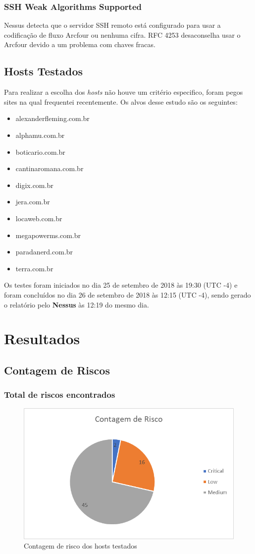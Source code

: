 \documentclass[
	12pt,				%
	openright,			%
	twoside,			%
	a4paper,			%
	english,			%
	french,				%
	spanish,			%
	brazil				%
	]{abntex2}
\begin{document}
\subsection{SSH Weak Algorithms Supported}
Nessus detecta que o servidor SSH remoto está configurado para usar a codificação de fluxo Arcfour ou nenhuma cifra. RFC 4253 desaconselha usar o Arcfour devido a um problema com chaves fracas.

\section{Hosts Testados}
Para realizar a escolha dos \textit{hosts} não houve um critério especifico, foram pegos sites na qual frequentei recentemente. Os alvos desse estudo são os seguintes:
\begin{itemize}
	\item alexanderfleming.com.br
	\item alphamu.com.br
	\item boticario.com.br
	\item cantinaromana.com.br
	\item digix.com.br
	\item jera.com.br
	\item locaweb.com.br
	\item megapowerms.com.br
	\item paradanerd.com.br
	\item terra.com.br
\end{itemize}
Os testes foram iniciados no dia 25 de setembro de 2018 às 19:30 (UTC -4) e foram concluídos no dia 26 de setembro de 2018 às 12:15 (UTC -4), sendo gerado o relatório pelo \textbf{Nessus} às 12:19 do mesmo dia.
\chapter{Resultados}
\section{Contagem de Riscos}

\subsection{Total de riscos encontrados}
\begin{figure}[h]
	\centering
	\includegraphics[width=0.7\linewidth]{Imagens/screenshot001}
	\caption[Contagem de Risco]{Contagem de risco dos hosts testados}
	\label{contagem_de_risco}
\end{figure}
\end{document}
